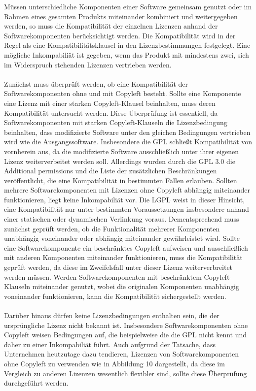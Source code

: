 Müssen unterschiedliche Komponenten einer Software gemeinsam genutzt oder im Rahmen eines gesamten Produkts miteinander kombiniert und weitergegeben werden, so muss die Kompatibilität der einzelnen Lizenzen anhand der Softwarekomponenten berücksichtigt werden. \cite{gerlach_praxisprobleme_2006} Die Kompatibilität wird in der Regel als eine Kompatibilitätsklausel in den Lizenzbestimmungen festgelegt. \cite{gerlach_praxisprobleme_2006} Eine mögliche Inkompabiliät ist gegeben, wenn das Produkt mit mindestens zwei, sich im Widerspruch stehenden Lizenzen vertrieben werden. \cite[S. 43]{bitkom_open_2016}\\\\ Zunächst muss überprüft werden, ob eine Kompatibilität der Softwarekomponenten ohne und mit Copyleft besteht. Sollte eine Komponente eine Lizenz mit einer starken Copyleft-Klausel beinhalten, muss deren Kompatibilität untersucht werden. Diese Überprüfung ist essentiell, da Softwarekomponenten mit starken Copyleft-Klauseln die Lizenzbedingung beinhalten, dass modifizierte Software unter den gleichen Bedingungen vertrieben wird wie die Ausgangssoftware. Insbesondere die GPL schließt Kompatibilität von vornherein aus, da die modifizierte Software ausschließlich unter ihrer eigenen Lizenz weiterverbeitet werden soll. Allerdings wurden durch die GPL 3.0 die Additional permissions und die Liste der zusätzlichen Beschränkungen veröffentlicht, die eine Kompatibilität in bestimmten Fällen erlauben. \cite[S. 64]{schaaf_open-source-lizenzen_2013} Sollten mehrere Softwarekomponenten mit Lizenzen ohne Copyleft abhängig miteinander funktionieren, liegt keine Inkompabiliät vor. Die LGPL weist in dieser Hinsicht, eine Kompatibilität nur unter bestimmten Voraussetzungen insbesondere anhand einer statischen oder dynamischen Verlinkung voraus. Dementsprechend muss zunächst geprüft werden, ob die Funktionalität mehrerer Komponenten unabhängig voneinander oder abhängig miteinander gewährleistet wird. \cite[S. 44]{bitkom_open_2016} Sollte eine Softwarekomponente ein beschränktes Copyleft aufweisen und ausschließlich mit anderen Komponenten miteinander funktionieren, muss die Kompatibilität geprüft werden, da diese im Zweifelsfall unter dieser Lizenz weiterverbreitet werden müssen. Werden Softwarekomponenten mit beschränktem Copyleft-Klauseln miteinander genutzt, wobei die originalen Komponenten unabhängig voneinander funktionieren, kann die Kompatibilität sichergestellt werden. \cite[S. 44]{bitkom_open_2016}\\\\ Darüber hinaus dürfen keine Lizenzbedingungen enthalten sein, die der ursprüngliche Lizenz nicht bekannt ist. \cite[S. 64]{schaaf_open-source-lizenzen_2013} Insbesondere Softwarekomponenten ohne Copyleft weisen Bedingungen auf, die beispielweise die die GPL nicht kennt und daher zu einer Inkompabiliät führt. Auch aufgrund der Tatsache, dass Unternehmen heutzutage dazu tendieren, Lizenzen von Softwarekomponenten ohne Copyleft zu verwenden wie in Abbildung 10 dargestellt, da diese im Vergleich zu anderen Lizenzen wesentlich flexibler sind, sollte diese Überprüfung durchgeführt werden. 


